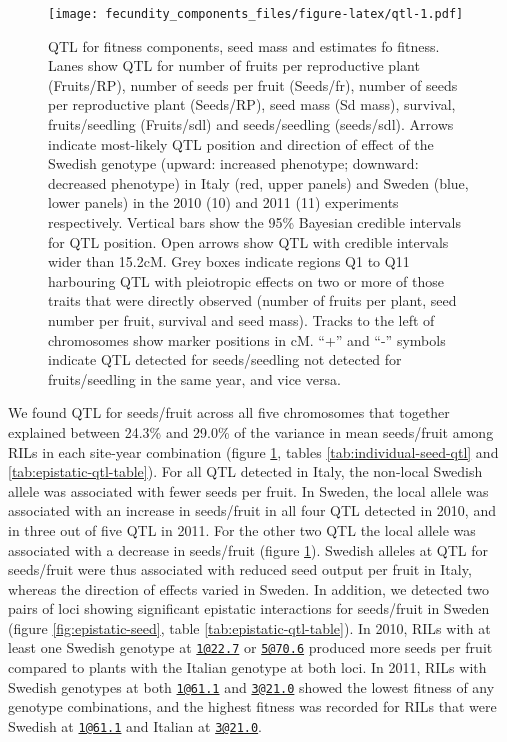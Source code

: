 \documentclass[]{article}
\begin{document}
\begin{figure}
\centering
\texttt{[image: fecundity\_components\_files/figure-latex/qtl-1.pdf]}
\caption{\label{fig:qtl}QTL for fitness components, seed mass and estimates fo fitness. Lanes show QTL for number of fruits per reproductive plant (Fruits/RP), number of seeds per fruit (Seeds/fr), number of seeds per reproductive plant (Seeds/RP), seed mass (Sd mass), survival, fruits/seedling (Fruits/sdl) and seeds/seedling (seeds/sdl). Arrows indicate most-likely QTL position and direction of effect of the Swedish genotype (upward: increased phenotype; downward: decreased phenotype) in Italy (red, upper panels) and Sweden (blue, lower panels) in the 2010 (10) and 2011 (11) experiments respectively. Vertical bars show the 95\% Bayesian credible intervals for QTL position. Open arrows show QTL with credible intervals wider than 15.2cM. Grey boxes indicate regions Q1 to Q11 harbouring QTL with pleiotropic effects on two or more of those traits that were directly observed (number of fruits per plant, seed number per fruit, survival and seed mass). Tracks to the left of chromosomes show marker positions in cM. ``+'' and ``-'' symbols indicate QTL detected for seeds/seedling not detected for fruits/seedling in the same year, and vice versa.}
\end{figure}

We found QTL for seeds/fruit across all five chromosomes that together explained between 24.3\% and 29.0\% of the variance in mean seeds/fruit among RILs in each site-year combination (figure \ref{fig:qtl}, tables \ref{tab:individual-seed-qtl} and \ref{tab:epistatic-qtl-table}). For all QTL detected in Italy, the non-local Swedish allele was associated with fewer seeds per fruit. In Sweden, the local allele was associated with an increase in seeds/fruit in all four QTL detected in 2010, and in three out of five QTL in 2011. For the other two QTL the local allele was associated with a decrease in seeds/fruit (figure \ref{fig:qtl}). Swedish alleles at QTL for seeds/fruit were thus associated with reduced seed output per fruit in Italy, whereas the direction of effects varied in Sweden. In addition, we detected two pairs of loci showing significant epistatic interactions for seeds/fruit in Sweden (figure \ref{fig:epistatic-seed}, table \ref{tab:epistatic-qtl-table}). In 2010, RILs with at least one Swedish genotype at \href{mailto:1@22.7}{\nolinkurl{1@22.7}} or \href{mailto:5@70.6}{\nolinkurl{5@70.6}} produced more seeds per fruit compared to plants with the Italian genotype at both loci. In 2011, RILs with Swedish genotypes at both \href{mailto:1@61.1}{\nolinkurl{1@61.1}} and \href{mailto:3@21.0}{\nolinkurl{3@21.0}} showed the lowest fitness of any genotype combinations, and the highest fitness was recorded for RILs that were Swedish at \href{mailto:1@61.1}{\nolinkurl{1@61.1}} and Italian at \href{mailto:3@21.0}{\nolinkurl{3@21.0}}.
\end{document}
